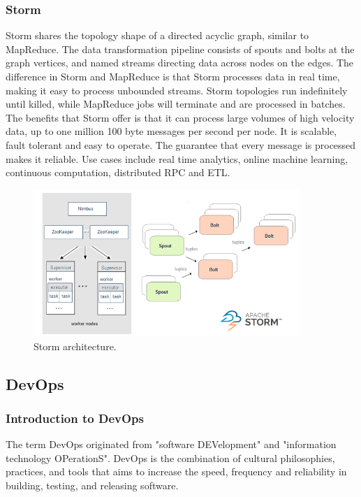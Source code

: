\subsubsection{Storm}
Storm shares the topology shape of a directed acyclic graph, similar to MapReduce. \cite{stormtut} The data transformation pipeline consists of spouts and bolts at the graph vertices, and named streams directing data across nodes on the edges. The difference in Storm and MapReduce is that Storm processes data in real time, making it easy to process unbounded streams. Storm topologies run indefinitely until killed, while MapReduce jobs will terminate and are processed in batches. 
The benefits that Storm offer is that it can process large volumes of high velocity data, up to one million 100 byte messages per second per node. It is scalable, fault tolerant and easy to operate. The guarantee that every message is processed makes it reliable. Use cases include real time analytics, online machine learning, continuous computation, distributed RPC and ETL.
\begin{figure}[h]
\centering
\caption{Storm architecture. \cite{diced1}}
\label{fig:storm}
\includegraphics[width=0.9\textwidth]{images/storm.png}
\end{figure}

\newpage

\subsection{DevOps}
\subsubsection{Introduction to DevOps}
The term DevOps originated from "software DEVelopment" and "information technology OPerationS". 
DevOps is the combination of cultural philosophies, practices, and tools that aims to increase the speed, frequency and reliability in building, testing, and releasing software. 

